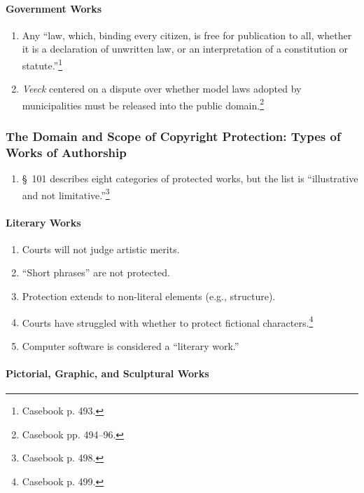 \paragraph{Government Works}

\begin{enumerate}
    \item Any ``law, which, binding every citizen, is free for publication to 
    all, whether it is a declaration of unwritten law, or an interpretation of 
    a constitution or statute.''\footnote{Casebook p. 493.}
    \item \emph{Veeck} centered on a dispute over whether model laws adopted 
    by municipalities must be released into the public 
    domain.\footnote{Casebook pp. 494--96.}
\end{enumerate}

\subsubsection{The Domain and Scope of Copyright Protection: Types of Works of 
Authorship}

\begin{enumerate}
    \item \S\ 101 describes eight categories of protected works, but the list 
    is ``illustrative and not limitative.''\footnote{Casebook p. 498.}
\end{enumerate}

\paragraph{Literary Works}

\begin{enumerate}
    \item Courts will not judge artistic merits.
    \item ``Short phrases'' are not protected.
    \item Protection extends to non-literal elements (e.g., structure).
    \item Courts have struggled with whether to protect fictional 
    characters.\footnote{Casebook p. 499.}
    \item Computer software is considered a ``literary work.''
\end{enumerate}

\paragraph{Pictorial, Graphic, and Sculptural Works}


